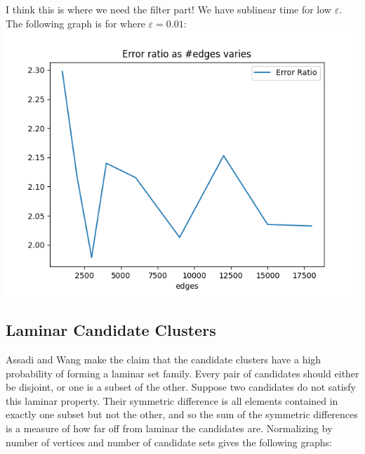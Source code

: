 \documentclass[
]{article}
\begin{document}
I think this is where we need the filter part! We have sublinear time
for low {\(\varepsilon\)}. The following graph is for where
{\(\varepsilon = 0.01\)}:\\
\includegraphics{images/error_ratio_as_edges_varies_low_epsilon.png}

\hypertarget{laminar-candidate-clusters}{%
\subsection{Laminar Candidate
Clusters}\label{laminar-candidate-clusters}}

Assadi and Wang make the claim that the candidate clusters have a high
probability of forming a laminar set family. Every pair of candidates
should either be disjoint, or one is a subset of the other. Suppose two
candidates do not satisfy this laminar property. Their symmetric
difference is all elements contained in exactly one subset but not the
other, and so the sum of the symmetric differences is a measure of how
far off from laminar the candidates are. Normalizing by number of
vertices and number of candidate sets gives the following graphs:
\end{document}
